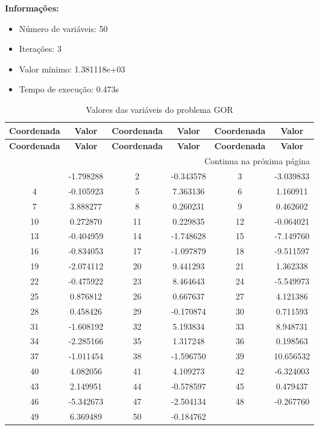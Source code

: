 \documentclass[12pt]{article}
\begin{document}
\textbf{Informações:}
\begin{itemize}
\item Número de variáveis: 50
\item Iterações: 3
\item Valor mínimo: 1.381118e+03
\item Tempo de execução: 0.473s
\end{itemize}

\small
\begin{longtable}{@{}cc|cc|cc@{}}
\caption{Valores das variáveis do problema GOR} \\
\toprule
\textbf{Coordenada} & \textbf{Valor} & \textbf{Coordenada} & \textbf{Valor} & \textbf{Coordenada} & \textbf{Valor} \\
\midrule
\endfirsthead

\toprule
\textbf{Coordenada} & \textbf{Valor} & \textbf{Coordenada} & \textbf{Valor} & \textbf{Coordenada} & \textbf{Valor} \\
\midrule
\endhead

\midrule \multicolumn{6}{r}{{Continua na próxima página}} \\ \midrule
\endfoot

\bottomrule
\endlastfoot
1 & -1.798288 & 2 & -0.343578 & 3 & -3.039833 \\
4 & -0.105923 & 5 & 7.363136 & 6 & 1.160911 \\
7 & 3.888277 & 8 & 0.260231 & 9 & 0.462602 \\
10 & 0.272870 & 11 & 0.229835 & 12 & -0.064021 \\
13 & -0.404959 & 14 & -1.748628 & 15 & -7.149760 \\
16 & -0.834053 & 17 & -1.097879 & 18 & -9.511597 \\
19 & -2.074112 & 20 & 9.441293 & 21 & 1.362338 \\
22 & -0.475922 & 23 & 8.464643 & 24 & -5.549973 \\
25 & 0.876812 & 26 & 0.667637 & 27 & 4.121386 \\
28 & 0.458426 & 29 & -0.170874 & 30 & 0.711593 \\
31 & -1.608192 & 32 & 5.193834 & 33 & 8.948731 \\
34 & -2.285166 & 35 & 1.317248 & 36 & 0.198563 \\
37 & -1.011454 & 38 & -1.596750 & 39 & 10.656532 \\
40 & 4.082056 & 41 & 4.109273 & 42 & -6.324003 \\
43 & 2.149951 & 44 & -0.578597 & 45 & 0.479437 \\
46 & -5.342673 & 47 & -2.504134 & 48 & -0.267760 \\
49 & 6.369489 & 50 & -0.184762 &  &  \\

\end{longtable}
\end{document}
